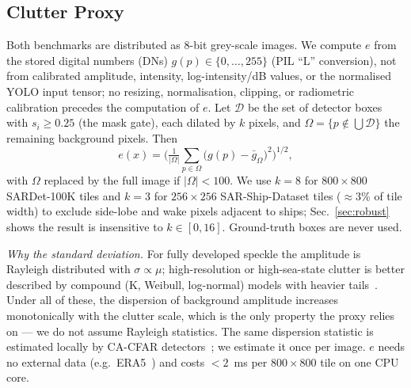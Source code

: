 \documentclass[journal]{IEEEtran}
\providecommand{\linelabel}[1]{}
\begin{document}
\subsection{Clutter Proxy}
\label{sec:proxy}
\linelabel{ln:dn}Both benchmarks are distributed as 8-bit grey-scale images. We compute
$e$ from the stored digital numbers (DNs) $g(p)\in\{0,\dots,255\}$
(PIL ``L'' conversion), not from calibrated amplitude, intensity,
log-intensity/dB values, or the normalised YOLO input tensor; no
resizing, normalisation, clipping, or radiometric calibration precedes
the computation of $e$.\linelabel{ln:dnend} Let $\mathcal{D}$ be the set
of detector boxes with $s_i\ge 0.25$ (the mask gate), each dilated by $k$
pixels, and $\Omega=\{p\notin\bigcup\mathcal{D}\}$ the remaining
background pixels. Then
\begin{equation}
  e(x)=\Big(\tfrac{1}{|\Omega|}\textstyle\sum_{p\in\Omega}\big(g(p)-\bar g_\Omega\big)^2\Big)^{1/2},
  \label{eq:proxy}
\end{equation}
with $\Omega$ replaced by the full image if $|\Omega|<100$. We use $k{=}8$
for $800\times800$ SARDet-100K tiles\linelabel{ln:k} and $k{=}3$ for $256\times256$
SAR-Ship-Dataset tiles ($\approx3\%$ of tile width) to exclude side-lobe
and wake pixels adjacent to ships; Sec.~\ref{sec:robust} shows the result is
insensitive to $k\in[0,16]$. Ground-truth boxes are never used.\linelabel{ln:kend}

\textit{Why the standard deviation.}\linelabel{ln:rayl}
For fully developed speckle the amplitude is Rayleigh distributed with
$\sigma\propto\mu$; high-resolution or high-sea-state clutter is better
described by compound (K, Weibull, log-normal) models with heavier
tails~\cite{ward1981,oliver2004}. Under all of these, the dispersion of
background amplitude increases monotonically with the clutter scale, which
is the only property the proxy relies on --- we do not assume Rayleigh
statistics. The same dispersion statistic is estimated locally by CA-CFAR
detectors~\cite{finn1968}; we estimate it once per image. $e$ needs no
external data (e.g.\ ERA5~\cite{hersbach2020}) and costs $<2$~ms per
$800\times800$ tile on one CPU core.\linelabel{ln:raylend}
\end{document}
